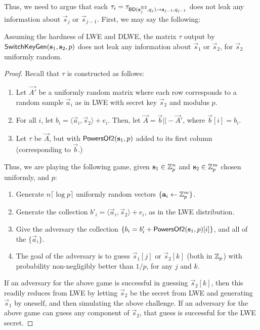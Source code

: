     Thus, we need to argue that each $\tau_i = \tau_{{\sf BD}(\vec{s}_j^{\otimes 2}, q_j) \to \vec{s}_{j-1}, q_{j-1}}$ does not leak any information about $\vec{s}_j$ or $\vec{s}_{j-1}$. First, we may say the following:
    \begin{lemma} \label{lem:tauleak}
        Assuming the hardness of LWE and DLWE, the matrix $\tau$ output by ${\sf SwitchKeyGen}(\vec{s}_1, \vec{s}_2, p)$ does not leak any information about $\vec{s}_1$ or $\vec{s}_2$, for $\vec{s}_2$  uniformly random.
    \end{lemma}
    \begin{proof}
        Recall that $\tau$ is constructed as follows:
        \begin{enumerate}
            \item Let $\vec{A'}$ be a uniformly random matrix where each row corresponds to a random sample $\vec{a}_i$ as in LWE with secret key $\vec{s}_2$ and modulus $p$.
            \item For all $i$, let $b_i = \langle \vec{a}_i, \vec{s}_2 \rangle + e_i$. Then, let $\vec{A} = \vec{b} || -\vec{A}'$, where $\vec{b}[i] = b_i$.
            \item Let $\tau$ be $\vec{A}$, but with ${\sf PowersOf2}(\vec{s}_1, p)$ added to its first column (corresponding to $\vec{b}$.)
        \end{enumerate}

        Thus, we are playing the following game, given $\vec{s}_1 \in \Z_p^{n}$ and $\vec{s}_2 \in \Z_p^m$ chosen uniformly, and $p$:
        \begin{enumerate}
            \item Generate $n \lceil \log p \rceil$ uniformly random vectors $\{\vec{a}_i \leftarrow \Z_p^m\}$.
            \item Generate the collection $b'_i = \langle \vec{a}_i, \vec{s}_2 \rangle + e_i$, as in the LWE distribution.
            \item Give the adversary the collection $\{b_i = b'_i + {\sf PowersOf2}(\vec{s}_1, p)[i]\}$, and all of the $\{\vec{a}_i\}$.
            \item The goal of the adversary is to guess $\vec{s}_1[j]$ or $\vec{s}_2[k]$ (both in $\Z_p$) with probability non-negligibly better than $1/p$, for any $j$ and $k$.
        \end{enumerate}

        If an adversary for the above game is successful in guessing $\vec{s}_2[k]$, then this readily reduces from LWE by letting $\vec{s}_2$ be the secret from LWE and generating $\vec{s}_1$ by oneself, and then simulating the above challenge. If an adversary for the above game can guess any component of $\vec{s}_2$, that guess is successful for the LWE secret.


\end{proof}
